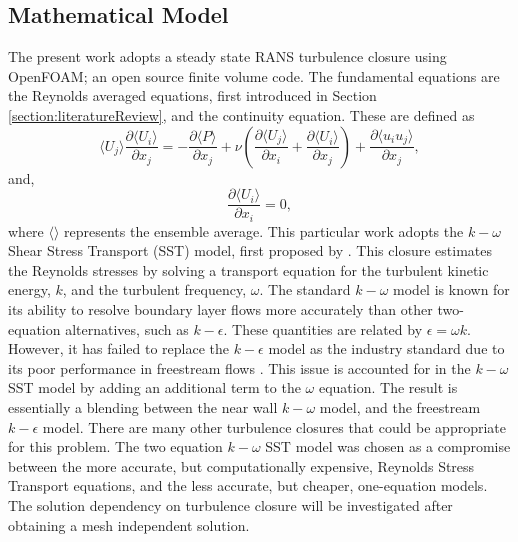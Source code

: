 \documentclass[12pt,oneside,a4paper]{article}
\newcommand{\pdev}[2]{\frac{\partial {#1}}{\partial {#2}}}
\begin{document}
\subsection{Mathematical Model}
\label{section:rans:maths}
The present work adopts a steady state RANS turbulence closure using OpenFOAM; an open source finite volume code. The fundamental equations are the Reynolds averaged equations, first introduced in Section \ref{section:literatureReview}, and the continuity equation. These are defined as
\begin{equation}
\label{equation:rans:mom}
\langle U_j \rangle \pdev{\langle U_i \rangle}{x_j}
=
-\pdev{\langle P \rangle}{x_j}
+
\nu
	\left(
	\pdev{\langle U_j \rangle}{x_i}
	+
	\pdev{\langle U_i \rangle}{x_j} 
	\right)
+
\pdev{\langle u_i u_j\rangle}{x_j},
\end{equation}
and,
\begin{equation}
\label{equation:rans:cont}
\pdev{\langle U_i\rangle}{x_i}=0,
\end{equation}
where $\langle  \rangle$ represents the ensemble average. This particular work adopts the $k-\omega$ Shear Stress Transport (SST) model,  first proposed by \cite{menter1994}. This closure estimates the Reynolds stresses by solving a transport equation for the turbulent kinetic energy, $k$, and the turbulent frequency, $\omega$. The standard $k-\omega$ model is known for its ability to resolve boundary layer flows more accurately than other two-equation alternatives, such as $k-\epsilon$. These quantities are related by $\epsilon = \omega k$. However, it has failed to replace the $k-\epsilon$ model as the industry standard due to its poor performance in freestream flows \citep{menter2003}. This issue is accounted for in the $k-\omega$ SST model by adding an additional term to the $\omega$ equation. The result is essentially a blending between the near wall $k-\omega$ model, and the freestream $k-\epsilon$ model. There are many other turbulence closures that could be appropriate for this problem. The two equation $k-\omega$ SST model was chosen as a compromise between the more accurate, but computationally expensive, Reynolds Stress Transport equations, and the less accurate, but cheaper, one-equation models. The solution dependency on turbulence closure will be investigated after obtaining a mesh independent solution.  
\end{document}
